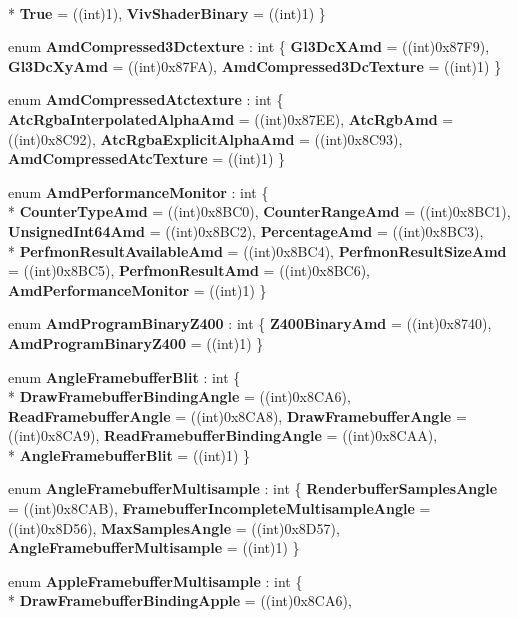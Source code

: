\begin{DoxyCompactItemize}
\\*
{\bfseries True} = ((int)1), 
{\bfseries Viv\-Shader\-Binary} = ((int)1)
 \}
\item 
enum {\bfseries Amd\-Compressed3\-Dctexture} \-: int \{ {\bfseries Gl3\-Dc\-X\-Amd} = ((int)0x87\-F9), 
{\bfseries Gl3\-Dc\-Xy\-Amd} = ((int)0x87\-F\-A), 
{\bfseries Amd\-Compressed3\-Dc\-Texture} = ((int)1)
 \}
\item 
enum {\bfseries Amd\-Compressed\-Atctexture} \-: int \{ {\bfseries Atc\-Rgba\-Interpolated\-Alpha\-Amd} = ((int)0x87\-E\-E), 
{\bfseries Atc\-Rgb\-Amd} = ((int)0x8\-C92), 
{\bfseries Atc\-Rgba\-Explicit\-Alpha\-Amd} = ((int)0x8\-C93), 
{\bfseries Amd\-Compressed\-Atc\-Texture} = ((int)1)
 \}
\item 
enum {\bfseries Amd\-Performance\-Monitor} \-: int \{ \\*
{\bfseries Counter\-Type\-Amd} = ((int)0x8\-B\-C0), 
{\bfseries Counter\-Range\-Amd} = ((int)0x8\-B\-C1), 
{\bfseries Unsigned\-Int64\-Amd} = ((int)0x8\-B\-C2), 
{\bfseries Percentage\-Amd} = ((int)0x8\-B\-C3), 
\\*
{\bfseries Perfmon\-Result\-Available\-Amd} = ((int)0x8\-B\-C4), 
{\bfseries Perfmon\-Result\-Size\-Amd} = ((int)0x8\-B\-C5), 
{\bfseries Perfmon\-Result\-Amd} = ((int)0x8\-B\-C6), 
{\bfseries Amd\-Performance\-Monitor} = ((int)1)
 \}
\item 
enum {\bfseries Amd\-Program\-Binary\-Z400} \-: int \{ {\bfseries Z400\-Binary\-Amd} = ((int)0x8740), 
{\bfseries Amd\-Program\-Binary\-Z400} = ((int)1)
 \}
\item 
enum {\bfseries Angle\-Framebuffer\-Blit} \-: int \{ \\*
{\bfseries Draw\-Framebuffer\-Binding\-Angle} = ((int)0x8\-C\-A6), 
{\bfseries Read\-Framebuffer\-Angle} = ((int)0x8\-C\-A8), 
{\bfseries Draw\-Framebuffer\-Angle} = ((int)0x8\-C\-A9), 
{\bfseries Read\-Framebuffer\-Binding\-Angle} = ((int)0x8\-C\-A\-A), 
\\*
{\bfseries Angle\-Framebuffer\-Blit} = ((int)1)
 \}
\item 
enum {\bfseries Angle\-Framebuffer\-Multisample} \-: int \{ {\bfseries Renderbuffer\-Samples\-Angle} = ((int)0x8\-C\-A\-B), 
{\bfseries Framebuffer\-Incomplete\-Multisample\-Angle} = ((int)0x8\-D56), 
{\bfseries Max\-Samples\-Angle} = ((int)0x8\-D57), 
{\bfseries Angle\-Framebuffer\-Multisample} = ((int)1)
 \}
\item 
enum {\bfseries Apple\-Framebuffer\-Multisample} \-: int \{ \\*
{\bfseries Draw\-Framebuffer\-Binding\-Apple} = ((int)0x8\-C\-A6), 

\end{DoxyCompactItemize}
